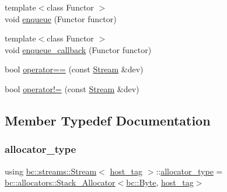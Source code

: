 \begin{DoxyCompactItemize}
\item 
{\footnotesize template$<$class Functor $>$ }\\void \hyperlink{classbc_1_1streams_1_1Stream_3_01host__tag_01_4_aa04282b3fe60b86aaa9619c705cd9dcb}{enqueue} (Functor functor)
\item 
{\footnotesize template$<$class Functor $>$ }\\void \hyperlink{classbc_1_1streams_1_1Stream_3_01host__tag_01_4_a04a3502ce852154d9ca1f72c337aab9d}{enqueue\+\_\+callback} (Functor functor)
\item 
bool \hyperlink{classbc_1_1streams_1_1Stream_3_01host__tag_01_4_ae7b83a71edf13adb6dbc2635c0c19620}{operator==} (const \hyperlink{classbc_1_1streams_1_1Stream}{Stream} \&dev)
\item 
bool \hyperlink{classbc_1_1streams_1_1Stream_3_01host__tag_01_4_a36bbb3a5afb51433488fe6139429fe73}{operator!=} (const \hyperlink{classbc_1_1streams_1_1Stream}{Stream} \&dev)
\end{DoxyCompactItemize}


\subsection{Member Typedef Documentation}
\mbox{\label{classbc_1_1streams_1_1Stream_3_01host__tag_01_4_a98a9510a8d26077263d3acab43094669}} 
\subsubsection{\texorpdfstring{allocator\+\_\+type}{allocator\_type}}
{\footnotesize\ttfamily using \hyperlink{classbc_1_1streams_1_1Stream}{bc\+::streams\+::\+Stream}$<$ \hyperlink{structbc_1_1host__tag}{host\+\_\+tag} $>$\+::\hyperlink{classbc_1_1streams_1_1Stream_3_01host__tag_01_4_a98a9510a8d26077263d3acab43094669}{allocator\+\_\+type} =  \hyperlink{classbc_1_1allocators_1_1Stack__Allocator}{bc\+::allocators\+::\+Stack\+\_\+\+Allocator}$<$\hyperlink{classbc_1_1allocators_1_1Byte}{bc\+::\+Byte}, \hyperlink{structbc_1_1host__tag}{host\+\_\+tag}$>$}

\mbox{\label{classbc_1_1streams_1_1Stream_3_01host__tag_01_4_a96382f855d558e07f52f8a324f5b13c4}} 
